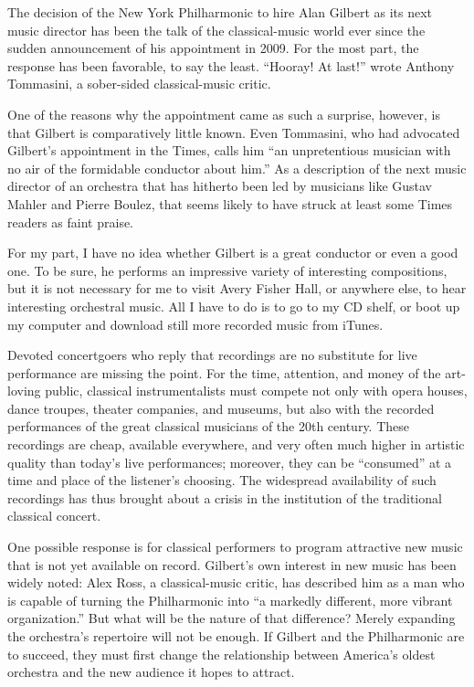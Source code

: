 \documentclass[UTF8,11pt]{ctexart}
\begin{document}
The decision of the New York Philharmonic to hire Alan Gilbert as its next music director has been the talk of the classical-music world ever since the sudden announcement of his appointment in 2009. For the most part, the response has been favorable, to say the least. “Hooray! At last!” wrote Anthony Tommasini, a sober-sided classical-music critic.


One of the reasons why the appointment came as such a surprise, however, is that Gilbert is comparatively little known. Even Tommasini, who had advocated Gilbert's appointment in the Times, calls him “an unpretentious musician with no air of the formidable conductor about him.” As a description of the next music director of an orchestra that has hitherto been led by musicians like Gustav Mahler and Pierre Boulez, that seems likely to have struck at least some Times readers as faint praise.


For my part, I have no idea whether Gilbert is a great conductor or even a good one. To be sure, he performs an impressive variety of interesting compositions, but it is not necessary for me to visit Avery Fisher Hall, or anywhere else, to hear interesting orchestral music. All I have to do is to go to my CD shelf, or boot up my computer and download still more recorded music from iTunes.


Devoted concertgoers who reply that recordings are no substitute for live performance are missing the point. For the time, attention, and money of the art-loving public, classical instrumentalists must compete not only with opera houses, dance troupes, theater companies, and museums, but also with the recorded performances of the great classical musicians of the 20th century. These recordings are cheap, available everywhere, and very often much higher in artistic quality than today's live performances; moreover, they can be “consumed” at a time and place of the listener's choosing. The widespread availability of such recordings has thus brought about a crisis in the institution of the traditional classical concert.


One possible response is for classical performers to program attractive new music that is not yet available on record. Gilbert's own interest in new music has been widely noted: Alex Ross, a classical-music critic, has described him as a man who is capable of turning the Philharmonic into “a markedly different, more vibrant organization.” But what will be the nature of that difference? Merely expanding the orchestra's repertoire will not be enough. If Gilbert and the Philharmonic are to succeed, they must first change the relationship between America's oldest orchestra and the new audience it hopes to attract.
\end{document}
